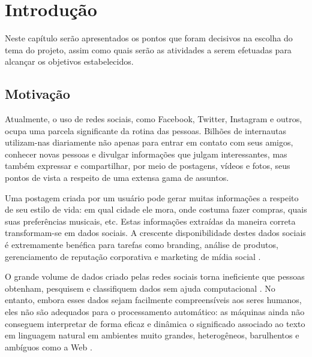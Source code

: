 \documentclass[
	12pt,				%
	openright,			%
	oneside,			%
	a4paper,			%
	english,			%
	spanish,			%
	brazil				%
	]{abntex2}
\begin{document}

 \pretextual

\imprimircapa

\tableofcontents*
\cleardoublepage


\textual

\chapter{Introdução}
	Neste capítulo serão apresentados os pontos que foram decisivos na escolha do tema do projeto, assim como quais serão as atividades a serem efetuadas para alcançar os objetivos estabelecidos.

	\section{Motivação}
	
	Atualmente, o uso de redes sociais, como Facebook, Twitter, Instagram e outros, ocupa uma parcela significante da rotina das pessoas. Bilhões de internautas utilizam-nas diariamente não apenas para entrar em contato com seus amigos, conhecer novas pessoas e divulgar informações que julgam interessantes, mas também expressar e compartilhar, por meio de postagens, vídeos e fotos, seus pontos de vista a respeito de uma extensa gama de assuntos.
	
	Uma postagem criada por um usuário pode gerar muitas informações a respeito de seu estilo de vida: em qual cidade ele mora, onde costuma fazer compras, quais suas preferências musicais, etc. Estas informações extraídas da maneira correta transformam-se em dados sociais. A crescente disponibilidade destes dados sociais é extremamente benéfica para tarefas como branding, análise de produtos, gerenciamento de reputação corporativa e marketing de mídia social \cite{article_sentiment_analysis}. 
	
	O grande volume de dados criado pelas redes sociais torna ineficiente que pessoas obtenham, pesquisem e classifiquem dados sem ajuda computacional \cite{conference_fb}. No entanto, embora esses dados sejam facilmente compreensíveis aos seres humanos, eles não são adequados para o processamento automático: as máquinas ainda não conseguem interpretar de forma eficaz e dinâmica o significado associado ao texto em linguagem natural em ambientes muito grandes, heterogêneos, barulhentos e ambíguos como a Web \cite{article_sentiment_analysis}.
\end{document}
